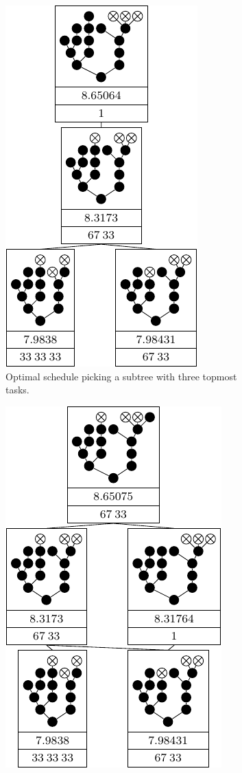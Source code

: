 \begin{figure}[ht]
  \centering
  \begin{subfigure}{.45\textwidth}
    \centering
    \includegraphics{p3/subtree_with_fewest_toptasks/subtree_with_fewest_toptasks_opt.pdf}
    \caption{Optimal schedule picking a subtree with three topmost tasks.}
  \end{subfigure}
  \quad
  \begin{subfigure}{.45\textwidth}
    \centering
    \includegraphics{p3/subtree_with_fewest_toptasks/subtree_with_fewest_toptasks_subopt.pdf}

\end{subfigure}
\end{figure}
